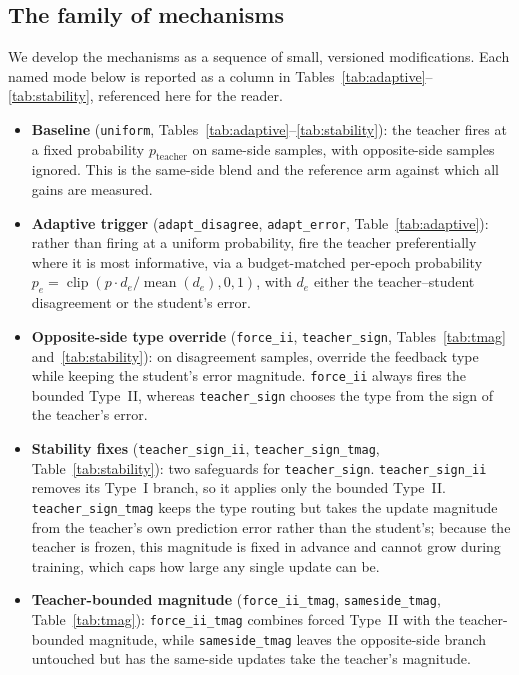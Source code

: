 \subsection{The family of mechanisms}
\label{sec:family}

We develop the mechanisms as a sequence of small, versioned modifications. Each named mode
below is reported as a column in Tables~\ref{tab:adaptive}--\ref{tab:stability}, referenced
here for the reader.

\begin{itemize}
  \item \textbf{Baseline} (\texttt{uniform}, Tables~\ref{tab:adaptive}--\ref{tab:stability}):
    the teacher fires at a fixed probability $p_{\text{teacher}}$ on same-side samples,
    with opposite-side samples ignored. This is the same-side blend and the reference arm
    against which all gains are measured.
  \item \textbf{Adaptive trigger} (\texttt{adapt\_disagree}, \texttt{adapt\_error},
    Table~\ref{tab:adaptive}): rather than firing at a uniform probability, fire the teacher
    preferentially where it is most informative, via a budget-matched per-epoch probability
    $p_e = \operatorname{clip}(p \cdot d_e / \operatorname{mean}(d_e), 0, 1)$, with $d_e$
    either the teacher--student disagreement or the student's error.
  \item \textbf{Opposite-side type override} (\texttt{force\_ii}, \texttt{teacher\_sign},
    Tables~\ref{tab:tmag} and~\ref{tab:stability}): on disagreement samples, override the
    feedback type while keeping the student's error magnitude. \texttt{force\_ii} always
    fires the bounded Type~II, whereas \texttt{teacher\_sign} chooses the type from the sign
    of the teacher's error.
  \item \textbf{Stability fixes} (\texttt{teacher\_sign\_ii}, \texttt{teacher\_sign\_tmag},
    Table~\ref{tab:stability}): two safeguards for \texttt{teacher\_sign}.
    \texttt{teacher\_sign\_ii} removes its Type~I branch, so it applies only the bounded
    Type~II. \texttt{teacher\_sign\_tmag} keeps the type routing but takes the update
    magnitude from the teacher's own prediction error rather than the student's; because the
    teacher is frozen, this magnitude is fixed in advance and cannot grow during training,
    which caps how large any single update can be.
  \item \textbf{Teacher-bounded magnitude} (\texttt{force\_ii\_tmag}, \texttt{sameside\_tmag},
    Table~\ref{tab:tmag}): \texttt{force\_ii\_tmag} combines forced Type~II with the
    teacher-bounded magnitude, while \texttt{sameside\_tmag} leaves the opposite-side branch
    untouched but has the same-side updates take the teacher's magnitude.
\end{itemize}

